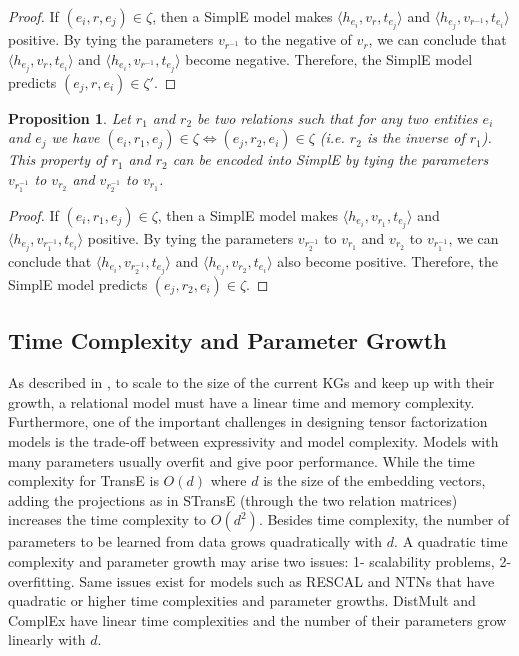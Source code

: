 \documentclass{article}
\newcommand{\triple}[3]{(\mathit{#1}, \mathit{#2}, \mathit{#3})}
\newtheorem{proposition}{Proposition}
\begin{document}
\begin{proof}
If $\triple{e_i}{r}{e_j}\in\zeta$, then a SimplE model makes $\langle h_{e_i}, v_r, t_{e_j} \rangle$ and $\langle h_{e_j}, v_{r^{-1}}, t_{e_i} \rangle$ positive. By tying the parameters $v_{r^{-1}}$ to the negative of $v_r$, we can conclude that $\langle h_{e_j}, v_r, t_{e_i} \rangle$ and $\langle h_{e_i}, v_{r^{-1}}, t_{e_j} \rangle$ become negative. Therefore, the SimplE model predicts $\triple{e_j}{r}{e_i}\in\zeta'$.
\end{proof}

\begin{proposition} \label{expert-prop3}
Let $r_1$ and $r_2$ be two relations such that for any two entities $e_i$ and $e_j$ we have $\triple{e_i}{r_1}{e_j}\in\zeta \iff \triple{e_j}{r_2}{e_i}\in\zeta$ (i.e. $r_2$ is the inverse of $r_1$). This property of $r_1$ and $r_2$ can be encoded into SimplE by tying the parameters $v_{r_1^{-1}}$ to $v_{r_2}$ and $v_{r_2^{-1}}$ to $v_{r_1}$.
\end{proposition}

\begin{proof}
If $\triple{e_i}{r_1}{e_j}\in\zeta$, then a SimplE model makes $\langle h_{e_i}, v_{r_1}, t_{e_j} \rangle$ and $\langle h_{e_j}, v_{r_1^{-1}}, t_{e_i} \rangle$ positive. By tying the parameters $v_{r_2^{-1}}$ to $v_{r_1}$ and $v_{r_2}$ to $v_{r_1^{-1}}$, we can conclude that $\langle h_{e_i}, v_{r_2^{-1}}, t_{e_j} \rangle$ and $\langle h_{e_j}, v_{r_2}, t_{e_i} \rangle$ also become positive. Therefore, the SimplE model predicts $\triple{e_j}{r_2}{e_i}\in\zeta$.
\end{proof}

\subsection{Time Complexity and Parameter Growth}
As described in \cite{bordes2013irreflexive}, to scale to the size of the current KGs and keep up with their growth, a relational model must have a linear time and memory complexity. Furthermore, one of the important challenges in designing tensor factorization models is the trade-off between expressivity and model complexity. Models with many parameters usually overfit and give poor performance.
While the time complexity for TransE is $O(d)$ where $d$ is the size of the embedding vectors, adding the projections as in STransE (through the two relation matrices) increases the time complexity to $O(d^2)$. Besides time complexity, the number of parameters to be learned from data grows quadratically with $d$. A quadratic time complexity and parameter growth may arise two issues: 1- scalability problems, 2- overfitting. Same issues exist for models such as RESCAL and NTNs that have quadratic or higher time complexities and parameter growths. DistMult and ComplEx have linear time complexities and the number of their parameters grow linearly with $d$. 
\end{document}

